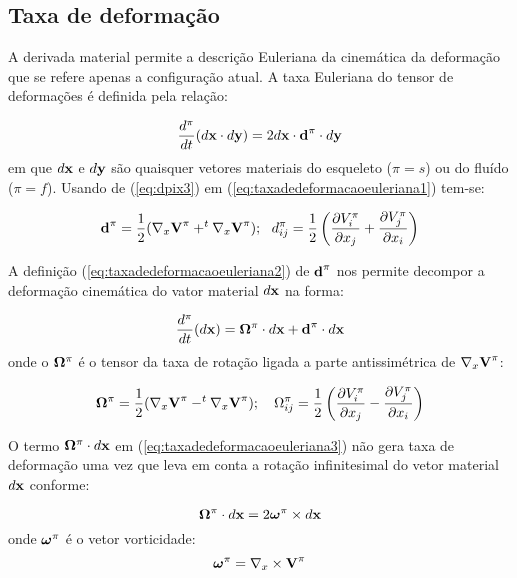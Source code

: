 \documentclass[
	11pt, %
	fleqn, %
	a4paper, %
]{LegrandOrangeBook}
\begin{document}
\subsection{Taxa de deformação}

A derivada material permite a descrição Euleriana da cinemática da deformação que se refere apenas a configuração atual. A taxa Euleriana do tensor de deformações é definida pela relação:

\begin{equation}
	\label{eq:taxadedeformacaoeuleriana1}	
	\dfrac{d^\pi}{dt}(d\textbf{x} \cdot d\textbf{y}) = 2d\textbf{x} \cdot \textbf{d}^{\pi} \cdot d\textbf{y}
\end{equation}
em que $d\textbf{x}$ e $d\textbf{y}$ são quaisquer vetores materiais do esqueleto ($\pi = s$) ou do fluído ($\pi = f$). Usando de (\ref{eq:dpix3}) em (\ref{eq:taxadedeformacaoeuleriana1}) tem-se: 

\begin{equation}
	\label{eq:taxadedeformacaoeuleriana2}	
\textbf{d}^{\pi} = \dfrac{1}{2}(\nabla_x \textbf{V}^{\pi} + ^{t}\nabla_x \textbf{V}^{\pi}); ~~ d^\pi_{ij} =  \dfrac{1}{2} \left(\dfrac{\partial V_i^\pi}{\partial x_j} + \dfrac{\partial V_j^\pi}{\partial x_i}\right)
\end{equation}

A definição (\ref{eq:taxadedeformacaoeuleriana2}) de $\textbf{d}^{\pi}$ nos permite decompor a deformação cinemática do vator material $d\textbf{x}$ na forma:

\begin{equation}
	\label{eq:taxadedeformacaoeuleriana3}	
	\dfrac{d^\pi}{dt}(d\textbf{x}) = \bm{\Omega}^\pi \cdot d\textbf{x} + \textbf{d}^\pi \cdot d\textbf{x}
\end{equation}
onde o $\bm{\Omega}^\pi$ é o tensor da taxa de rotação ligada a parte antissimétrica de $\nabla_x \textbf{V}^\pi$:

\begin{equation}
	\label{eq:taxadedeformacaoeuleriana4}	
\bm{\Omega}^\pi = \dfrac{1}{2}(\nabla_x \textbf{V}^{\pi} - ^{t}\nabla_x \textbf{V}^{\pi}); ~~~ \Omega^\pi_{ij} = \dfrac{1}{2}\left(\dfrac{\partial V_i^\pi}{\partial x_j}-\dfrac{\partial V_j^\pi}{\partial x_i} \right)
\end{equation}

O termo $\bm{\Omega}^\pi \cdot d\textbf{x}$ em (\ref{eq:taxadedeformacaoeuleriana3}) não gera taxa de deformação uma vez que leva em conta a rotação infinitesimal do vetor material $d\textbf{x}$ conforme:

\begin{equation}
	\label{eq:taxadedeformacaoeuleriana5}	
	\bm{\Omega}^\pi \cdot d\textbf{x} = 2 \bm{\omega}^\pi \times d\textbf{x}
\end{equation}
onde $\bm{\omega}^\pi$ é o vetor vorticidade:
\begin{equation}
	\label{eq:vetorvorticidade}	
	\bm{\omega}^\pi = \nabla_x \times \textbf{V}^\pi
\end{equation}
\end{document}
